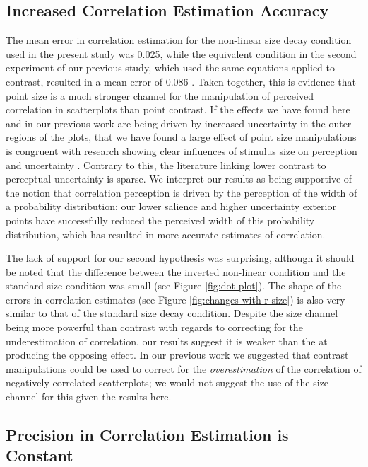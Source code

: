 \documentclass{vgtc}                          %
\begin{document}
\hypertarget{increased-correlation-estimation-accuracy}{%
\subsection{Increased Correlation Estimation Accuracy}\label{increased-correlation-estimation-accuracy}}

The mean error in correlation estimation for the non-linear size decay condition used
in the present study was 0.025, while the equivalent condition in the second experiment
of our previous study, which used the same equations applied to contrast, resulted
in a mean error of 0.086 \cite{strain_2023}. Taken together, this is evidence that point
size is a much stronger channel for the manipulation of perceived correlation in
scatterplots than point contrast. If the effects we have found here and in our
previous work are being driven by increased uncertainty in the outer regions of the plots,
that we have found a large effect of point size manipulations is congruent
with research showing clear influences of stimulus size on perception and uncertainty
\cite{hong_2021, grice_1983, alais_2004}. Contrary to this, the literature linking
lower contrast to perceptual uncertainty is sparse. We interpret our results
as being supportive of the notion that correlation perception is driven
by the perception of the width of a probability distribution; our lower salience
and higher uncertainty exterior points have successfully reduced the perceived width
of this probability distribution, which has resulted in more accurate estimates
of correlation.

The lack of support for our second hypothesis was surprising, although it should
be noted that the difference between the inverted non-linear condition and the standard size
condition was small (see Figure \ref{fig:dot-plot}). The shape of the errors
in correlation estimates (see Figure \ref{fig:changes-with-r-size}) is also
very similar to that of the standard size decay condition. Despite the size channel
being more powerful than contrast with regards to correcting
for the underestimation of correlation, our results suggest it is weaker than the at
producing the opposing effect. In our previous work we suggested that contrast
manipulations could be used to correct for the \emph{overestimation} of the correlation
of negatively correlated scatterplots; we would not suggest the use of the size
channel for this given the results here.

\hypertarget{precision-in-correlation-estimation-is-constant}{%
\subsection{Precision in Correlation Estimation is Constant}\label{precision-in-correlation-estimation-is-constant}}
\end{document}
